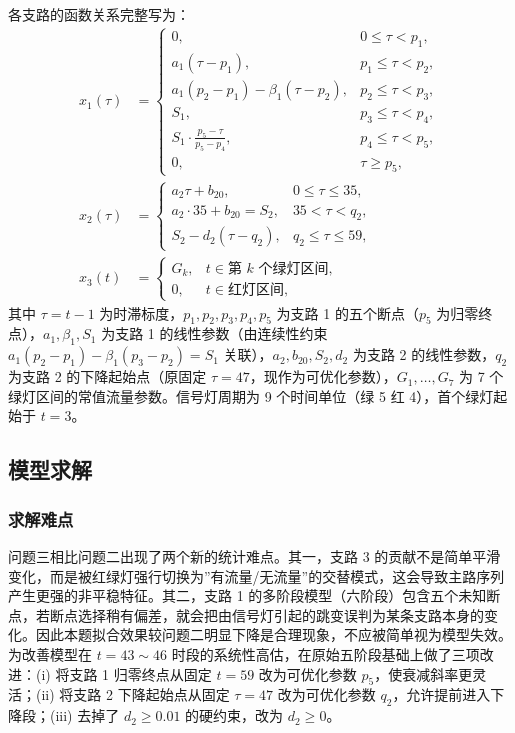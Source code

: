 \documentclass[UTF8,a4paper,fontset=none]{ctexart}
\numberwithin{equation}{section}
\begin{document}
各支路的函数关系完整写为：
\begin{align}
  x_1(\tau) &= \begin{cases}
    0, & 0\le\tau<p_1,\\
    a_1(\tau-p_1), & p_1\le\tau<p_2,\\
    a_1(p_2-p_1)-\beta_1(\tau-p_2), & p_2\le\tau<p_3,\\
    S_1, & p_3\le\tau<p_4,\\
    \displaystyle S_1\cdot\frac{p_5-\tau}{p_5-p_4}, & p_4\le\tau<p_5,\\
    0, & \tau\ge p_5,
  \end{cases} \label{eq:q3_b1} \\
  x_2(\tau) &= \begin{cases}
    a_2\tau+b_{20}, & 0\le\tau\le35,\\
    a_2\cdot35+b_{20}=S_2, & 35<\tau<q_2,\\
    S_2-d_2(\tau-q_2), & q_2\le\tau\le59,
  \end{cases} \label{eq:q3_b2} \\
  x_3(t) &= \begin{cases}
    G_k, & t\in\text{第 }k\text{ 个绿灯区间},\\
    0, & t\in\text{红灯区间},
  \end{cases} \label{eq:q3_b3}
\end{align}
其中 $\tau=t-1$ 为时滞标度，$p_1,p_2,p_3,p_4,p_5$ 为支路 1 的五个断点（$p_5$ 为归零终点），$a_1,\beta_1,S_1$ 为支路 1 的线性参数（由连续性约束 $a_1(p_2-p_1)-\beta_1(p_3-p_2)=S_1$ 关联），$a_2,b_{20},S_2,d_2$ 为支路 2 的线性参数，$q_2$ 为支路 2 的下降起始点（原固定 $\tau=47$，现作为可优化参数），$G_1,\dots,G_7$ 为 7 个绿灯区间的常值流量参数。信号灯周期为 9 个时间单位（绿 5 红 4），首个绿灯起始于 $t=3$。

\subsection{模型求解}
\subsubsection{求解难点}
问题三相比问题二出现了两个新的统计难点。其一，支路 3 的贡献不是简单平滑变化，而是被红绿灯强行切换为''有流量/无流量''的交替模式，这会导致主路序列产生更强的非平稳特征。其二，支路 1 的多阶段模型（六阶段）包含五个未知断点，若断点选择稍有偏差，就会把由信号灯引起的跳变误判为某条支路本身的变化。因此本题拟合效果较问题二明显下降是合理现象，不应被简单视为模型失效。为改善模型在 $t=43\sim 46$ 时段的系统性高估，在原始五阶段基础上做了三项改进：(i) 将支路 1 归零终点从固定 $t=59$ 改为可优化参数 $p_5$，使衰减斜率更灵活；(ii) 将支路 2 下降起始点从固定 $\tau=47$ 改为可优化参数 $q_2$，允许提前进入下降段；(iii) 去掉了 $d_2\ge 0.01$ 的硬约束，改为 $d_2\ge 0$。
\end{document}
